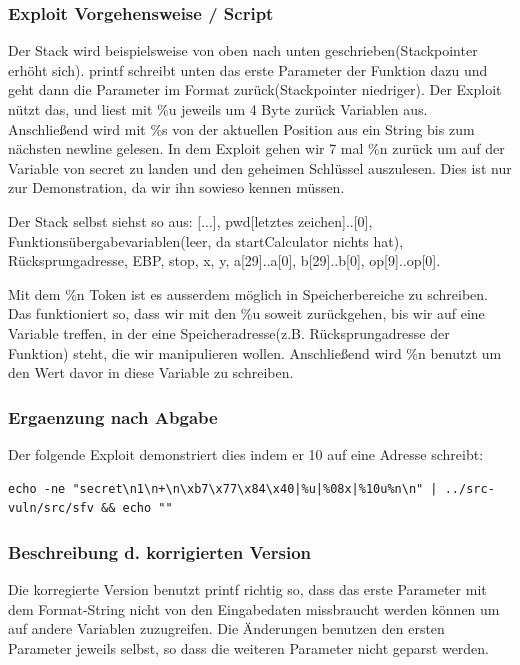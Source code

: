 \documentclass[12pt,a4paper,titlepage,oneside]{scrartcl}
\begin{document}
\subsubsection{Exploit Vorgehensweise / Script}
\noindent
Der Stack wird beispielsweise von oben nach unten geschrieben(Stackpointer erhöht sich). printf schreibt unten das erste Parameter der Funktion dazu und geht dann die Parameter im Format zurück(Stackpointer niedriger). Der Exploit nützt das, und liest mit \%u jeweils um 4 Byte zurück Variablen aus. Anschließend wird mit \%s von der aktuellen Position aus ein String bis zum nächsten newline gelesen. In dem Exploit gehen wir 7 mal \%n zurück um auf der Variable von secret zu landen und den geheimen Schlüssel auszulesen. Dies ist nur zur Demonstration, da wir ihn sowieso kennen müssen.

Der Stack selbst siehst so aus: [...], pwd[letztes zeichen]..[0], Funktionsübergabevariablen(leer, da startCalculator nichts hat), Rücksprungadresse, EBP, stop, x, y, a[29]..a[0], b[29]..b[0], op[9]..op[0].

Mit dem \%n Token ist es ausserdem möglich in Speicherbereiche zu schreiben. Das funktioniert so, dass wir mit den \%u soweit zurückgehen, bis wir auf eine Variable treffen, in der eine Speicheradresse(z.B. Rücksprungadresse der Funktion) steht, die wir manipulieren wollen. Anschließend wird \%n benutzt um den Wert davor in diese Variable zu schreiben.

\subsubsection{Ergaenzung nach Abgabe}

Der folgende Exploit demonstriert dies indem er 10 auf eine Adresse schreibt:

\begin{lstlisting}[caption=Exploit,label=code:exploit,style=simple]
echo -ne "secret\n1\n+\n\xb7\x77\x84\x40|%u|%08x|%10u%n\n" | ../src-vuln/src/sfv && echo ""
\end{lstlisting}

\subsubsection{Beschreibung d. korrigierten Version}
\noindent
Die korregierte Version benutzt printf richtig so, dass das erste Parameter mit dem Format-String nicht von den Eingabedaten missbraucht werden können um auf andere Variablen zuzugreifen. Die Änderungen benutzen den ersten Parameter jeweils selbst, so dass die weiteren Parameter nicht geparst werden.
\end{document}
